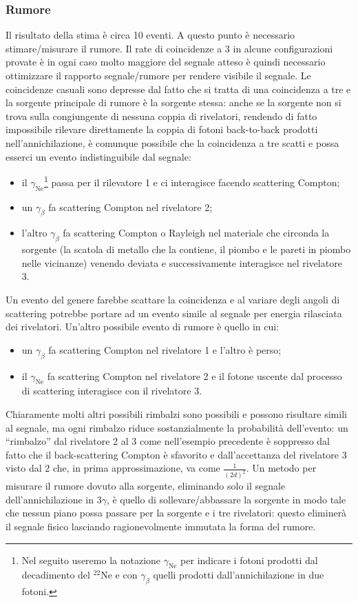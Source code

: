 \subsubsection{Rumore}
Il risultato della stima è circa 10 eventi. A questo punto è necessario stimare/misurare il rumore.
Il rate di coincidenze a 3 in alcune configurazioni provate è in ogni caso molto maggiore del segnale atteso è quindi necessario ottimizzare il rapporto segnale/rumore per rendere visibile il segnale.
Le coincidenze casuali sono depresse dal fatto che si tratta di una coincidenza a tre e la sorgente principale di rumore è la sorgente stessa: 
anche se la sorgente non si trova sulla congiungente di nessuna coppia di rivelatori, rendendo di fatto impossibile rilevare direttamente la coppia di fotoni back-to-back prodotti nell'annichilazione, è comunque possibile che la coincidenza a tre scatti e possa esserci un evento indistinguibile dal segnale:
\begin{itemize}
	\item il $\gamma_{\text{Ne}}$\footnote{Nel seguito useremo la notazione $\gamma_{\text{Ne}}$ per indicare i fotoni prodotti dal decadimento del $^{22}\text{Ne}$ e con $\gamma_{\beta}$ quelli prodotti dall'annichilazione in due fotoni.} passa per il rilevatore 1 e ci interagisce facendo scattering Compton;
	\item un $\gamma_{\beta}$ fa scattering Compton nel rivelatore 2;
	\item l'altro $\gamma_{\beta}$ fa scattering Compton o Rayleigh nel materiale che circonda la sorgente (la scatola di metallo che la contiene, il piombo e le pareti in piombo nelle vicinanze) venendo deviata e successivamente interagisce nel rivelatore 3.
\end{itemize}
Un evento del genere farebbe scattare la coincidenza e al variare degli angoli di scattering potrebbe portare ad un evento simile al segnale per energia rilasciata dei rivelatori. Un'altro possibile evento di rumore è quello in cui:
\begin{itemize}
	\item un $\gamma_{\beta}$ fa scattering Compton nel rivelatore 1 e l'altro è perso;
	\item il $\gamma_{\text{Ne}}$ fa scattering Compton nel rivelatore 2 e il fotone uscente dal processo di scattering interagisce con il rivelatore 3.
\end{itemize}
Chiaramente molti altri possibili rimbalzi sono possibili e possono risultare simili al segnale, ma ogni rimbalzo riduce sostanzialmente la probabilità dell'evento: un ``rimbalzo'' dal rivelatore 2 al 3 come nell'esempio precedente è soppresso dal fatto che il back-scattering Compton è sfavorito e dall'accettanza del rivelatore 3 visto dal 2 che, in prima approssimazione, va come $\frac{1}{(2d)^2}$.
Un metodo per misurare il rumore dovuto alla sorgente, eliminando solo il segnale dell'annichilazione in $3\gamma$, è quello di sollevare/abbassare la sorgente in modo tale che nessun piano possa passare per la sorgente e i tre rivelatori: questo eliminerà il segnale fisico lasciando ragionevolmente immutata la forma del rumore.
